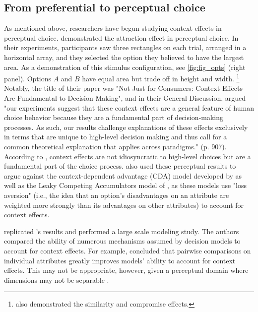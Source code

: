 \subsection{From preferential to perceptual choice}

As mentioned above, researchers have begun studying context effects in perceptual choice. \textcite{trueblood2013not} demonstrated the attraction effect in perceptual choice. In their experiments, participants saw three rectangles on each trial, arranged in a horizontal array, and they selected the option they believed to have the largest area. As a demonstration of this stimulus configuration, see \ref{fig:fig_opts} (right panel).  Options $A$ and $B$ have equal area but trade off in height and width. \footnote{\textcite{trueblood2013not} also demonstrated the similarity and compromise effects.} Notably, the title of their paper was "Not Just for Consumers: Context Effects Are Fundamental to Decision Making", and in their General Discussion, \textcite{trueblood2013not} argued "our experiments suggest that these context effects are a general feature of human choice behavior because they are a fundamental part of decision-making processes. As such, our results challenge explanations of these effects exclusively in terms that are unique to high-level decision making and thus call for a common theoretical explanation that applies across paradigms." (p. 907). According to \textcite{trueblood2013not}, context effects are not idiosyncratic to high-level choices but are a fundamental part of the choice process. \textcite{trueblood2013not} also used these perceptual results to argue against the context-dependent advantage (CDA) model developed by \textcite{tversky1993context} as well as the Leaky Competing Accumulators model of \textcite{usherLossAversionInhibition2004a}, as these models use "loss aversion" (i.e., the idea that an option's disadvantages on an attribute are weighted more strongly than its advantages on other attributes) to account for context effects. 

\textcite{turnerCompetingTheoriesMultialternative2018a} replicated \textcite{trueblood2013not}'s results and performed a large scale modeling study. The authors compared the ability of numerous mechanisms assumed by decision models to account for context effects. For example, \textcite{turnerCompetingTheoriesMultialternative2018a} concluded that pairwise comparisons on individual attributes greatly improves models' ability to account for context effects. This may not be appropriate, however, given a perceptual domain where dimensions may not be separable \parencite{ashbyVarietiesPerceptualIndependence1986a}. 

